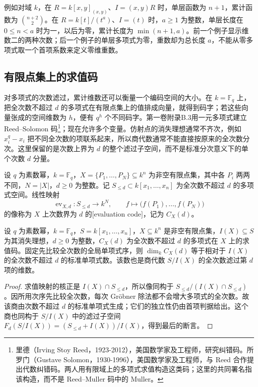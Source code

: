 \ProseParagraphBreak
例如对域 \(k\)，在 \(R=k[x,y]_{(x,y)}\)、\(I=(x,y)R\) 时，单层函数为 \(n+1\)，累计函数为 \(\binom{n+2}{2}\)。在 \(R=k[t]/(t^a)\)、\(I=(t)\) 时，\(a\ge1\) 为整数，单层长度在 \(0\le n<a\) 时为一，以后为零，累计长度为 \(\min(n+1,a)\)。前一个例子显示维数二的两种次数；后一个例子的单层多项式为零，重数却为总长度 \(a\)，不能从零多项式取一个首项系数来定义零维重数。

\subsection{有限点集上的求值码}
\label{b3:subsec:evaluation-codes}
\label{b3:subsec:1102:05}

对多项式的次数滤过，累计维数还可以衡量一个编码空间的大小。在 \(k=\mathbb F_q\) 上，把全次数不超过 \(d\) 的多项式在有限点集上的值排成向量，就得到码字；若这些向量张成的空间维数为 \(h\)，便有 \(q^h\) 个不同码字。第一卷附录B.3用一元多项式建立 Reed--Solomon 码\footnote{里德（Irving Stoy Reed，1923-2012），美国数学家及工程师，研究纠错码。所罗门（Gustave Solomon，1930-1996），美国数学家及工程师，与 Reed 合作提出代数纠错码。两人用有限域上的多项式求值构造这类码；这里的共同署名指该构造，而不是 Reed--Muller 码中的 Muller。}；现在允许多个变量。仿射点的消失理想通常不齐次，例如 \(x_i^q-x_i\) 把不同全次数的项联系起来，所以商代数通常不能直接按原来的全次数分次。这里保留的是次数上界为 \(d\) 的整个滤过子空间，而不是标准分次意义下的单个次数 \(d\) 分量。

\begin{definition}\label{b3:def:evaluation-code-finite-set}
	设 \(q\) 为素数幂，\(k=\mathbb F_q\)，\(X=\{P_1,\ldots,P_N\}\subseteq k^n\) 为非空有限点集，其中各 \(P_i\) 两两不同，\(N=|X|\)，\(d\ge0\) 为整数。记 \(S_{\le d}\subset k[x_1,\ldots,x_n]\) 为全次数不超过 \(d\) 的多项式空间。线性映射
	\[
		\operatorname{ev}_{X,d}:S_{\le d}\longrightarrow k^N, \qquad f\longmapsto\bigl(f(P_1),\ldots,f(P_N)\bigr)
	\]
	的像称为 \(X\) 上次数界为 \(d\) 的[evaluation code]，记为 \(C_X(d)\)。
\end{definition}

\begin{proposition}\label{b3:prop:evaluation-code-hilbert}
	设 \(q\) 为素数幂，\(k=\mathbb F_q\)，\(S=k[x_1,\ldots,x_n]\)，\(X\subseteq k^n\) 是非空有限点集，\(I(X)\subseteq S\) 为其消失理想，\(d\ge0\) 为整数，\(C_X(d)\) 为全次数不超过 \(d\) 的多项式在 \(X\) 上的求值码。固定先比较全次数的全局单项式序，则 \(\dim_k C_X(d)\) 等于相对于 \(I(X)\) 的全次数不超过 \(d\) 的标准单项式数。该数也是商代数 \(S/I(X)\) 的全次数滤过第 \(d\) 项的维数。
\end{proposition}
\begin{proof}
	求值映射的核正是 \(I(X)\cap S_{\le d}\)，所以像同构于 \(S_{\le d}/(I(X)\cap S_{\le d})\)。因所用次序先比较全次数，每次 Gröbner 除法都不会增大多项式的全次数。故该商由次数不超过 \(d\) 的标准单项式生成；它们的独立性仍由首项判据给出。这个商也同构于 \(S/I(X)\) 中的滤过子空间 \(F_d(S/I(X))=(S_{\le d}+I(X))/I(X)\)，得到最后的断言。
\end{proof}


